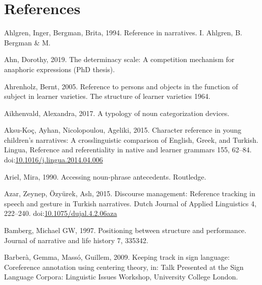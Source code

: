 \documentclass[]{elsarticle} %
\newlength{\cslhangindent}
\newenvironment{CSLReferences}[2] %
 {%
  \setlength{\parindent}{0pt}
  \ifodd #1 \everypar{\setlength{\hangindent}{\cslhangindent}}\ignorespaces\fi
  \ifnum #2 > 0
  \setlength{\parskip}{#2\baselineskip}
  \fi
 }%
 {}
\begin{document}
\clearpage

\hypertarget{references}{%
\section*{References}\label{references}}

\hypertarget{refs}{}
\begin{CSLReferences}{1}{0}
\leavevmode{}%
Ahlgren, Inger, Bergman, Brita, 1994. Reference in narratives. I.
Ahlgren, B. Bergman \& M.

\leavevmode{}%
Ahn, Dorothy, 2019. The determinacy scale: A competition mechanism for
anaphoric expressions (PhD thesis).

\leavevmode{}%
Ahrenholz, Bernt, 2005. Reference to persons and objects in the function
of subject in learner varieties. The structure of learner varieties
1964.

\leavevmode{}%
Aikhenvald, Alexandra, 2017. A typology of noun categorization devices.

\leavevmode{}%
Aksu-Koç, Ayhan, Nicolopoulou, Ageliki, 2015. Character reference in
young children's narratives: A crosslinguistic comparison of English,
Greek, and Turkish. Lingua, Reference and referentiality in native and
learner grammars 155, 62--84.
doi:\href{https://doi.org/10.1016/j.lingua.2014.04.006}{10.1016/j.lingua.2014.04.006}

\leavevmode{}%
Ariel, Mira, 1990. Accessing noun-phrase antecedents. Routledge.

\leavevmode{}%
Azar, Zeynep, Özyürek, Aslı, 2015. Discourse management: Reference
tracking in speech and gesture in Turkish narratives. Dutch Journal of
Applied Linguistics 4, 222--240.
doi:\href{https://doi.org/10.1075/dujal.4.2.06aza}{10.1075/dujal.4.2.06aza}

\leavevmode{}%
Bamberg, Michael GW, 1997. Positioning between structure and
performance. Journal of narrative and life history 7, 335342.

\leavevmode{}%
Barberà, Gemma, Massó, Guillem, 2009. Keeping track in sign language:
Coreference annotation using centering theory, in: Talk Presented at the
Sign Language Corpora: Linguistic Issues Workshop, University College
London.


\end{CSLReferences}
\end{document}
